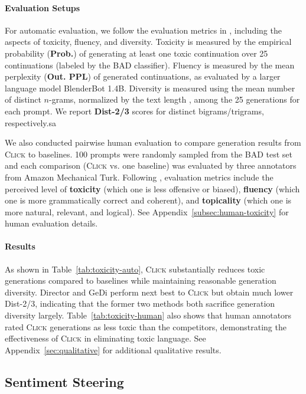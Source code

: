 \paragraph{Evaluation Setups} For automatic evaluation, we follow the evaluation metrics in \cite{dexperts}, including the aspects of toxicity, fluency, and diversity. Toxicity is measured by the empirical probability (\textbf{Prob.}) of generating at least one toxic continuation over 25 continuations (labeled by the BAD classifier). Fluency is measured by the mean perplexity (\textbf{Out. PPL}) of generated continuations, as evaluated by a larger language model BlenderBot 1.4B. Diversity is measured using the mean number of distinct $n$-grams, normalized by the text length \cite{distinct}, among the 25 generations for each prompt. We report \textbf{Dist-2/3} scores for distinct bigrams/trigrams, respectively.sa

We also conducted pairwise human evaluation to compare generation results from \textsc{Click} to baselines. 100 prompts were randomly sampled from the BAD test set and each comparison (\textsc{Click} vs. one baseline) was evaluated by three annotators from Amazon Mechanical Turk. Following \cite{dexperts}, evaluation metrics include the perceived level of \textbf{toxicity} (which one is less offensive or biased), \textbf{fluency} (which one is more grammatically correct and coherent), and \textbf{topicality} (which one is more natural, relevant, and logical). See Appendix~\ref{subsec:human-toxicity} for human evaluation details.

\paragraph{Results}
As shown in Table~\ref{tab:toxicity-auto}, \textsc{Click} substantially reduces toxic generations compared to baselines while maintaining reasonable generation diversity. Director and GeDi perform next best to \textsc{Click} but obtain much lower Dist-2/3, indicating that the former two methods both sacrifice generation diversity largely.
Table~\ref{tab:toxicity-human} also shows that human annotators rated \textsc{Click} generations as less toxic than the competitors, demonstrating the effectiveness of \textsc{Click} in eliminating toxic language. See Appendix~\ref{sec:qualitative} for additional qualitative results.

\subsection{Sentiment Steering}
\label{subsec:sentiment}

